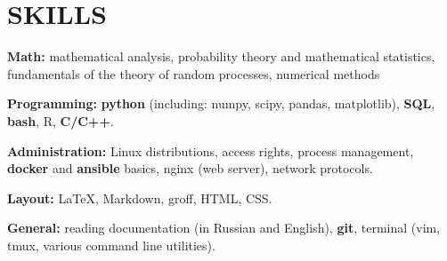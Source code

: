 \section{SKILLS}

\begin{description}

    \setlength\itemsep{-0.4em}

    \item{\bfseries Math:}
        mathematical analysis, probability theory and mathematical statistics, fundamentals of the theory of random processes, numerical methods

    \item{\bfseries Programming:}
        \textbf{python} (including: numpy, scipy, pandas, matplotlib), \textbf{SQL}, \textbf{bash}, R, \textbf{C/C++}.

    \item{\bfseries Administration:}
        Linux distributions, access rights, process management, \textbf{docker}
        and \textbf{ansible} basics, nginx (web server), network protocols.

    \item{\bfseries Layout:}
    \LaTeX, Markdown, groff, HTML, CSS.

    \item{\bfseries General:}
        reading documentation (in Russian and English), \textbf{git}, terminal (vim,
        tmux, various command line utilities).

\end{description}
    
    \vspace{.7em}
